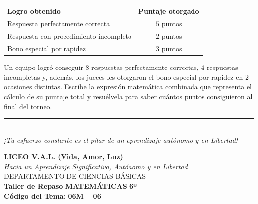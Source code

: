 \documentclass[12pt, letterpaper]{article}
\begin{document}
\begin{enumerate}[itemsep=0.8cm]
		\begin{table}[h]
			\centering
			\begin{tabular}{lc}
				\toprule
				\textbf{Logro obtenido} & \textbf{Puntaje otorgado} \\
				\midrule
				Respuesta perfectamente correcta & $5$ puntos \\
				Respuesta con procedimiento incompleto & $2$ puntos \\
				Bono especial por rapidez & $3$ puntos \\
				\bottomrule
			\end{tabular}
		\end{table}
		
		Un equipo logró conseguir $8$ respuestas perfectamente correctas, $4$ respuestas incompletas y, además, los jueces les otorgaron el bono especial por rapidez en $2$ ocasiones distintas. Escribe la expresión matemática combinada que representa el cálculo de su puntaje total y resuélvela para saber cuántos puntos consiguieron al final del torneo.
		
	\end{enumerate}
	
	\vfill
	\begin{center}
		\rule{0.5\textwidth}{0.4pt} \\
		\vspace{0.2cm}
		\textit{¡Tu esfuerzo constante es el pilar de un aprendizaje autónomo y en Libertad!}
	\end{center}
	
	\newpage
	\begin{center}
		{\Large \textbf{LICEO V.A.L. (Vida, Amor, Luz)}}\\[0.1cm]
		{\normalsize \textit{Hacia un Aprendizaje Significativo, Autónomo y en Libertad}}\\[0.2cm]
		{\large DEPARTAMENTO DE CIENCIAS BÁSICAS}\\[0.1cm]
		\textbf{Taller de Repaso MATEMÁTICAS 6º}\\[0.1cm]
		\textbf{Código del Tema: 06M – 06}\\[0.1cm]
	\end{center}
	
\end{document}
